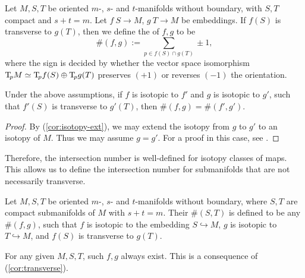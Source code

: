 \begin{definition}
Let $M,S,T$ be oriented $m$-, $s$- and $t$-manifolds without boundary,
with $S,T$ compact and $s+t=m$.
Let $f\:S\to M$, $g\:T\to M$ be embeddings.
If $f(S)$ is transverse to $g(T)$, then we define the
 of $f,g$ to be
\[\#(f,g):=\sum_{p\in f(S)\cap g(T)}\pm1,\]
where the sign is decided by whether the vector space isomorphism
$\mathrm{T}\!_pM\simeq\mathrm{T}\!_pf(S)\oplus\mathrm{T}\!_pg(T)$
preserves $(+1)$ or reverses $(-1)$ the orientation.
\end{definition}

\begin{proposition}
Under the above assumptions, if $f$ is isotopic to $f'$ and $g$ is isotopic to $g'$,
such that $f'(S)$ is transverse to $g'(T)$, then $\#(f,g)=\#(f',g')$.
\end{proposition}

\begin{proof}
By (\ref{cor:isotopy-ext}), we may extend the isotopy from $g$ to $g'$ to an isotopy of $M$.
Thus we may assume $g=g'$.
For a proof in this case, see \cite[p.\,108]{gp}. 
\end{proof}

Therefore, the intersection number is well-defined for isotopy classes of maps.
This allows us to define the intersection number for submanifolds
that are not necessarily transverse.

\begin{definition}
Let $M,S,T$ be oriented $m$-, $s$- and $t$-manifolds without boundary,
where $S,T$ are compact submanifolds of $M$ with $s+t=m$.
Their  $\#(S,T)$
is defined to be any $\#(f,g)$, such that $f$ is isotopic to the embedding $S\hookrightarrow M$,
$g$ is isotopic to $T\hookrightarrow M$, and $f(S)$ is transverse to $g(T)$.
\end{definition}

For any given $M,S,T$, such $f,g$ always exist.
This is a consequence of (\ref{cor:transverse}). 

